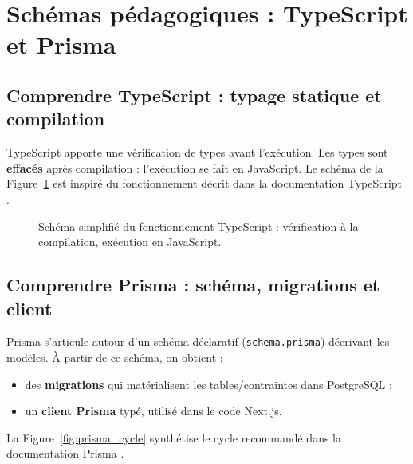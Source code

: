 \section{Schémas pédagogiques : TypeScript et Prisma}

\subsection{Comprendre TypeScript : typage statique et compilation}
TypeScript apporte une vérification de types avant l’exécution. Les types sont \textbf{effacés} après compilation : l’exécution se fait en JavaScript.
Le schéma de la Figure~\ref{fig:ts_pipeline} est inspiré du fonctionnement décrit dans la documentation TypeScript \cite{typescriptDocs}.

\begin{figure}[H]
    \centering
    \caption{Schéma simplifié du fonctionnement TypeScript : vérification à la compilation, exécution en JavaScript.}
    \label{fig:ts_pipeline}
\end{figure}

\subsection{Comprendre Prisma : schéma, migrations et client}
Prisma s’articule autour d’un schéma déclaratif (\texttt{schema.prisma}) décrivant les modèles. À partir de ce schéma, on obtient :
\begin{itemize}
    \item des \textbf{migrations} qui matérialisent les tables/contraintes dans PostgreSQL ;
    \item un \textbf{client Prisma} typé, utilisé dans le code Next.js.
\end{itemize}
La Figure~\ref{fig:prisma_cycle} synthétise le cycle recommandé dans la documentation Prisma \cite{prismaDocs}.


